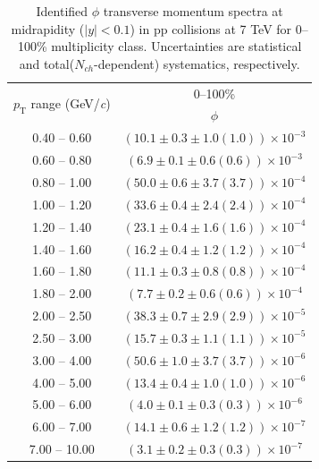 \clearpage
\begin{table}
\caption{Identified $\phi$ transverse momentum spectra at midrapidity ($|y|<0.1$) in pp collisions at 7 TeV for 0--100\% multiplicity class. Uncertainties are statistical and total($N_{ch}$-dependent) systematics, respectively.}
\label{tab:Phi_0to100}
\begin{center}
\begin{tabular}{ c | c }
\hline
\multirow{2}{*}{$p_{\mathrm{T}}$ range (GeV/\textit{c})} & \multicolumn{1}{c}{0--100\%} \\ & $\phi$\\ 
\hline
0.40 -- 0.60 & $(10.1\pm0.3\pm1.0(1.0))\times10^{-3}$ \\ 
0.60 -- 0.80 & $(6.9\pm0.1\pm0.6(0.6))\times10^{-3}$ \\ 
0.80 -- 1.00 & $(50.0\pm0.6\pm3.7(3.7))\times10^{-4}$ \\ 
1.00 -- 1.20 & $(33.6\pm0.4\pm2.4(2.4))\times10^{-4}$ \\ 
1.20 -- 1.40 & $(23.1\pm0.4\pm1.6(1.6))\times10^{-4}$ \\ 
1.40 -- 1.60 & $(16.2\pm0.4\pm1.2(1.2))\times10^{-4}$ \\ 
1.60 -- 1.80 & $(11.1\pm0.3\pm0.8(0.8))\times10^{-4}$ \\ 
1.80 -- 2.00 & $(7.7\pm0.2\pm0.6(0.6))\times10^{-4}$ \\ 
2.00 -- 2.50 & $(38.3\pm0.7\pm2.9(2.9))\times10^{-5}$ \\ 
2.50 -- 3.00 & $(15.7\pm0.3\pm1.1(1.1))\times10^{-5}$ \\ 
3.00 -- 4.00 & $(50.6\pm1.0\pm3.7(3.7))\times10^{-6}$ \\ 
4.00 -- 5.00 & $(13.4\pm0.4\pm1.0(1.0))\times10^{-6}$ \\ 
5.00 -- 6.00 & $(4.0\pm0.1\pm0.3(0.3))\times10^{-6}$ \\ 
6.00 -- 7.00 & $(14.1\pm0.6\pm1.2(1.2))\times10^{-7}$ \\ 
7.00 -- 10.00 & $(3.1\pm0.2\pm0.3(0.3))\times10^{-7}$ \\ 
\hline
\end{tabular}
\end{center}
\end{table}
 
